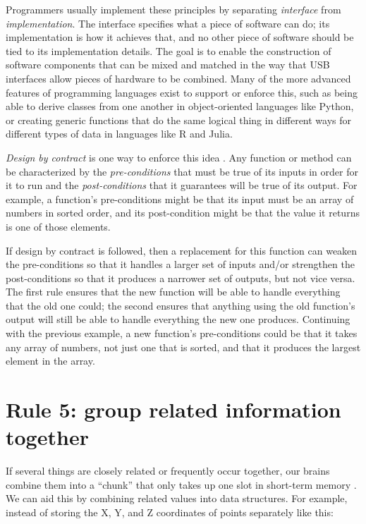 \documentclass[10pt,letterpaper]{article}
\begin{document}
Programmers usually implement these principles
by separating \emph{interface} from \emph{implementation}.
The interface specifies what a piece of software can do;
its implementation is how it achieves that,
and no other piece of software should be tied to its implementation details.
The goal is to enable the construction of software components
that can be mixed and matched in the way that USB interfaces allow pieces of hardware to be combined.
Many of the more advanced features of programming languages exist to support or enforce this,
such as being able to derive classes from one another in object-oriented languages like Python,
or creating generic functions that do the same logical thing in different ways for different types of data in languages like R and Julia.

\emph{Design by contract} is one way to enforce this idea \cite{Meyer1994}.
Any function or method can be characterized by
the \emph{pre-conditions} that must be true of its inputs in order for it to run
and the \emph{post-conditions} that it guarantees will be true of its output.
For example,
a function's pre-conditions might be that its input must be
an array of numbers in sorted order,
and its post-condition might be that
the value it returns is one of those elements.

If design by contract is followed,
then a replacement for this function can weaken the pre-conditions
so that it handles a larger set of inputs
and/or strengthen the post-conditions
so that it produces a narrower set of outputs,
but not vice versa.
The first rule ensures that the new function will be able to handle
everything that the old one could;
the second ensures that anything using the old function's output
will still be able to handle everything the new one produces.
Continuing with the previous example,
a new function's pre-conditions could be that it takes any array of numbers,
not just one that is sorted,
and that it produces the largest element in the array.

\section*{Rule 5: group related information together}

If several things are closely related or frequently occur together,
our brains combine them into a ``chunk''
that only takes up one slot in short-term memory \cite{Thalmann2019}.
We can aid this by combining related values into data structures.
For example,
instead of storing the X, Y, and Z coordinates of points separately like this:
\end{document}
